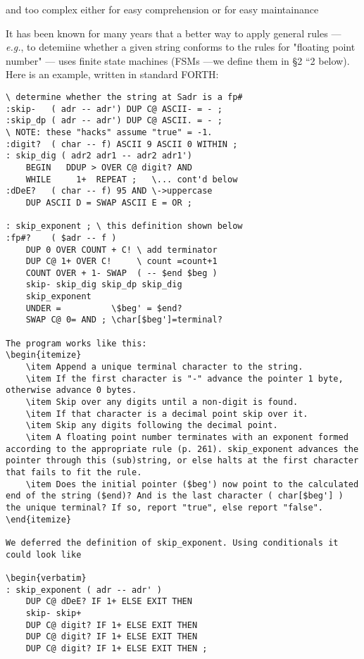 and too complex either for easy comprehension or for easy maintainance

It has been known for many years that a better way to apply general rules — \textit{e.g.}, to detemiine whether a given string conforms to the rules for "floating point number" --- uses finite state machines (FSMs —we define them in §2 “2 below). Here is an example, written in standard FORTH:

\begin{verbatim}
\ determine whether the string at Sadr is a fp#
:skip-   ( adr -- adr') DUP C@ ASCII- = - ;
:skip_dp ( adr -- adr') DUP C@ ASCII. = - ;
\ NOTE: these "hacks" assume "true" = -1.
:digit?  ( char -- f) ASCII 9 ASCII 0 WITHIN ;
: skip_dig ( adr2 adr1 -- adr2 adr1')
    BEGIN   DDUP > OVER C@ digit? AND
    WHILE     1+  REPEAT ;   \... cont'd below
:dDeE?   ( char -- f) 95 AND \->uppercase
    DUP ASCII D = SWAP ASCII E = OR ;

: skip_exponent ; \ this definition shown below
:fp#?    ( $adr -- f )
    DUP 0 OVER COUNT + C! \ add terminator
    DUP C@ 1+ OVER C!     \ count =count+1
    COUNT OVER + 1- SWAP  ( -- $end $beg )
    skip- skip_dig skip_dp skip_dig
    skip_exponent
    UNDER =          \$beg' = $end?
    SWAP C@ 0= AND ; \char[$beg']=terminal?

The program works like this:
\begin{itemize}
    \item Append a unique terminal character to the string.
    \item If the first character is "-" advance the pointer 1 byte, otherwise advance 0 bytes.
    \item Skip over any digits until a non-digit is found.
    \item If that character is a decimal point skip over it.
    \item Skip any digits following the decimal point.
    \item A floating point number terminates with an exponent formed according to the appropriate rule (p. 261). skip_exponent advances the pointer through this (sub)string, or else halts at the first character that fails to fit the rule.
    \item Does the initial pointer ($beg') now point to the calculated end of the string ($end)? And is the last character ( char[$beg'] ) the unique terminal? If so, report "true", else report "false".
\end{itemize}

We deferred the definition of skip_exponent. Using conditionals it could look like

\begin{verbatim}
: skip_exponent ( adr -- adr' )
    DUP C@ dDeE? IF 1+ ELSE EXIT THEN
    skip- skip+
    DUP C@ digit? IF 1+ ELSE EXIT THEN
    DUP C@ digit? IF 1+ ELSE EXIT THEN
    DUP C@ digit? IF 1+ ELSE EXIT THEN ;
\end{verbatim}

